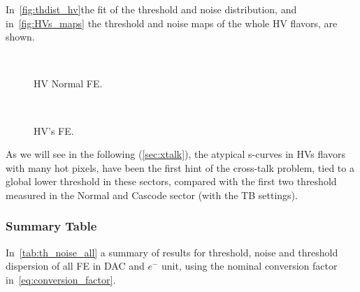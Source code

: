 In~\autoref{fig:thdist_hv}the fit of the threshold and noise distribution, and in~\autoref{fig:HVs_maps} the threshold and noise maps of the whole HV flavors, are shown. 

\begin{figure}[h!]
\centering
{}\quad
{}\\
\caption{HV Normal FE.}
\label{fig:thdist_hv}
\end{figure}


\begin{figure}[h!]
\centering
{}\quad
{}\\
\caption{HV's FE.}
\label{fig:HVs_maps}
\end{figure}

As we will see in the following (\autoref{sec:xtalk}), the atypical s-curves in HVs flavors with many hot pixels, have been the first hint of the cross-talk problem, tied to a global lower threshold in these sectors, compared with the first two threshold measured in the Normal and Cascode sector (with the TB settings). 


\subsubsection{Summary Table}

In~\autoref{tab:th_noise_all} a summary of results for threshold, noise and threshold dispersion of all FE in DAC and $e^{-}$ unit, using the nominal conversion factor in~\autoref{eq:conversion_factor}.

